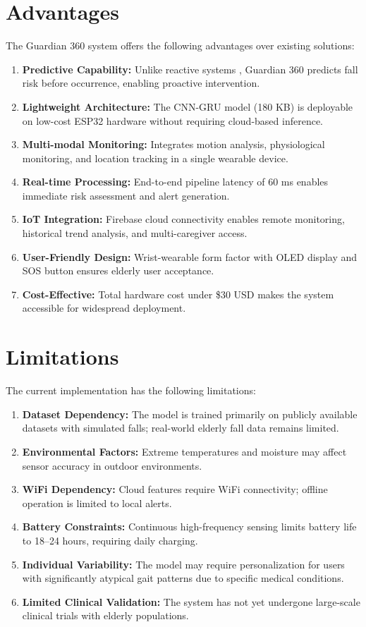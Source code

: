 \documentclass[conference]{IEEEtran}
\begin{document}
\section{Advantages}

The Guardian 360 system offers the following advantages over existing solutions:

\begin{enumerate}
    \item \textbf{Predictive Capability:} Unlike reactive systems \cite{saraubon2018, kumar2024sensor}, Guardian 360 predicts fall risk before occurrence, enabling proactive intervention.
    \item \textbf{Lightweight Architecture:} The CNN-GRU model (180 KB) is deployable on low-cost ESP32 hardware without requiring cloud-based inference.
    \item \textbf{Multi-modal Monitoring:} Integrates motion analysis, physiological monitoring, and location tracking in a single wearable device.
    \item \textbf{Real-time Processing:} End-to-end pipeline latency of 60 ms enables immediate risk assessment and alert generation.
    \item \textbf{IoT Integration:} Firebase cloud connectivity enables remote monitoring, historical trend analysis, and multi-caregiver access.
    \item \textbf{User-Friendly Design:} Wrist-wearable form factor with OLED display and SOS button ensures elderly user acceptance.
    \item \textbf{Cost-Effective:} Total hardware cost under \$30 USD makes the system accessible for widespread deployment.
\end{enumerate}

\section{Limitations}

The current implementation has the following limitations:

\begin{enumerate}
    \item \textbf{Dataset Dependency:} The model is trained primarily on publicly available datasets with simulated falls; real-world elderly fall data remains limited.
    \item \textbf{Environmental Factors:} Extreme temperatures and moisture may affect sensor accuracy in outdoor environments.
    \item \textbf{WiFi Dependency:} Cloud features require WiFi connectivity; offline operation is limited to local alerts.
    \item \textbf{Battery Constraints:} Continuous high-frequency sensing limits battery life to 18--24 hours, requiring daily charging.
    \item \textbf{Individual Variability:} The model may require personalization for users with significantly atypical gait patterns due to specific medical conditions.
    \item \textbf{Limited Clinical Validation:} The system has not yet undergone large-scale clinical trials with elderly populations.
\end{enumerate}
\end{document}
